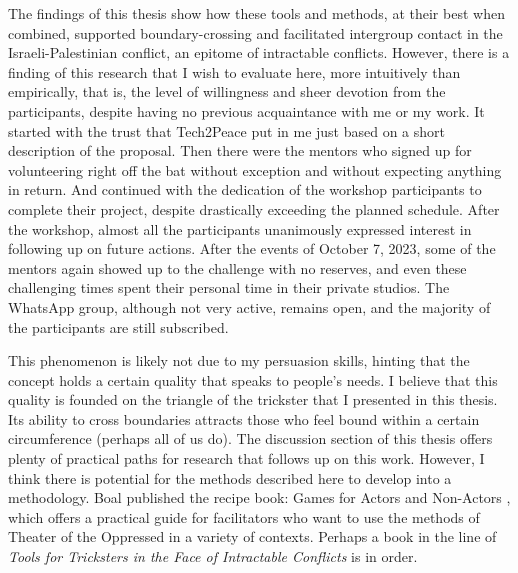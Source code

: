 \documentclass[dissertation,math,vertlayout,pdfa,colorlinks]{aaltoseries}
\begin{document}
The findings of this thesis show how these tools and methods, at their best when combined, supported boundary-crossing and facilitated intergroup contact in the Israeli-Palestinian conflict, an epitome of intractable conflicts. However, there is a finding of this research that I wish to evaluate here, more intuitively than empirically, that is, the level of willingness and sheer devotion from the participants, despite having no previous acquaintance with me or my work. It started with the trust that Tech2Peace put in me just based on a short description of the proposal. Then there were the mentors who signed up for volunteering right off the bat without exception and without expecting anything in return. And continued with the dedication of the workshop participants to complete their project, despite drastically exceeding the planned schedule. After the workshop, almost all the participants unanimously expressed interest in following up on future actions. After the events of October 7, 2023, some of the mentors again showed up to the challenge with no reserves, and even these challenging times spent their personal time in their private studios. The WhatsApp group, although not very active, remains open, and the majority of the participants are still subscribed.

This phenomenon is likely not due to my persuasion skills, hinting that the concept holds a certain quality that speaks to people's needs. I believe that this quality is founded on the triangle of the trickster that I presented in this thesis. Its ability to cross boundaries attracts those who feel bound within a certain circumference (perhaps all of us do). The discussion section of this thesis offers plenty of practical paths for research that follows up on this work. However, I think there is potential for the methods described here to develop into a methodology. Boal published the recipe book: Games for Actors and Non-Actors \cite{boalGamesActorsNonActors2021}, which offers a practical guide for facilitators who want to use the methods of Theater of the Oppressed in a variety of contexts. Perhaps a book in the line of \textit{Tools for Tricksters in the Face of Intractable Conflicts} is in order.

\renewcommand{\bibname}{References}
\LARGE  %


\end{document}
